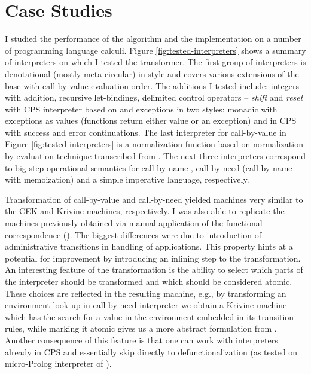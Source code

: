 \chapter{Case Studies}\label{chapter:case-studies}
I studied the performance of the algorithm and the implementation on a number of programming language calculi.
Figure \ref{fig:tested-interpreters} shows a summary of interpreters on which I tested the transformer.
The first group of interpreters is denotational (mostly meta-circular) in style and covers various extensions of the base \LC{} with call-by-value evaluation order.
The additions I tested include: integers with addition, recursive let-bindings, delimited control operators -- \textit{shift} and \textit{reset} with CPS interpreter based on \cite{biernacka-delimited-continuations} and exceptions in two styles: monadic with exceptions as values (functions return either value or an exception) and in CPS with success and error continuations.
The last interpreter for call-by-value in Figure \ref{fig:tested-interpreters} is a normalization function based on normalization by evaluation technique transcribed from \cite{abel-nbe}.
The next three interpreters correspond to big-step operational semantics for call-by-name \LC{}, call-by-need (call-by-name with memoization) and a simple imperative language, respectively.

Transformation of call-by-value and call-by-need \LC{} yielded machines very similar to the CEK and Krivine machines, respectively.
I was also able to replicate the machines previously obtained via manual application of the functional correspondence (\cite{functional-correspondence,biernacka-delimited-continuations,biernacki-logic-engine}).
The biggest differences were due to introduction of administrative transitions in handling of applications.
This property hints at a potential for improvement by introducing an inlining step to the transformation.
An interesting feature of the transformation is the ability to select which parts of the interpreter should be transformed and which should be considered atomic.
These choices are reflected in the resulting machine, e.g., by transforming an environment look up in call-by-need interpreter we obtain a Krivine machine which has the search for a value in the environment embedded in its transition rules, while marking it atomic gives us a more abstract formulation from \cite{functional-correspondence}.
Another consequence of this feature is that one can work with interpreters already in CPS and essentially skip directly to defunctionalization (as tested on micro-Prolog interpreter of \cite{biernacki-logic-engine}).

